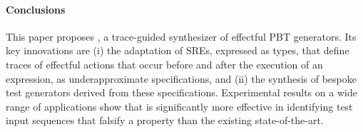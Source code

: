 
\paragraph{\textbf {Conclusions}}
This paper proposes \name, a trace-guided synthesizer of effectful PBT
generators.  Its key innovations are (i) the adaptation of SREs,
expressed as types, that define traces of effectful actions that occur
before and after the execution of an expression, as underapproximate
specifications, and (ii) the synthesis of bespoke test generators
derived from these specifications.  Experimental results on a wide
range of applications show that \name{} is significantly more
effective in identifying test input sequences that falsify a property
than the existing state-of-the-art.
